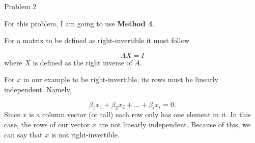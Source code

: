 \begin{problem}{Problem 2}
    \begin{Highlight}
        \noindent For this problem, I am going to use \textbf{Method 4}. \vspace*{1em}

        For a matrix to be defined as right-invertible it must follow

        \begin{equation}
            AX = I
        \end{equation}
        where $X$ is defined as the right inverse of $A$.

        For $x$ in our example to be right-invertible, its rows must be linearly independent. Namely,

        \begin{equation}
            \beta_{1}x_{1} + \beta_{2}x_{2} + \dots + \beta_{i}x_{i} = 0.
        \end{equation}
        Since $x$ is a column vector (or tall) each row only has one element in it. In this case, the rows of our vector $x$ are not linearly independent. Because of this, we can say that $x$ is not 
        right-invertible.
    \end{Highlight}
\end{problem}

